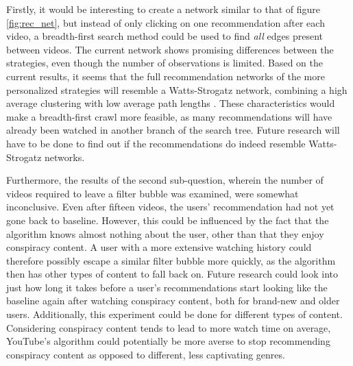 \documentclass[../main.tex]{subfiles}
\begin{document}
Firstly, it would be interesting to create a network similar to that of figure \ref{fig:rec_net}, but instead of only 
clicking on one recommendation after each video, a breadth-first search method could be used to find \textit{all} edges 
present between videos. The current network shows promising differences between the strategies, even though the number 
of observations is limited. Based on the current results, it seems that the full recommendation networks of the more
personalized strategies will resemble a Watts-Strogatz network, combining a high average clustering with low average
path lengths \citep{watts1998collective}. These characteristics would make a breadth-first crawl more feasible, as many
recommendations will have already been watched in another branch of the search tree. Future research will have to be
done to find out if the recommendations do indeed resemble Watts-Strogatz networks. 

Furthermore, the results of the second sub-question, wherein the number of videos required to leave a filter bubble was
examined, were somewhat inconclusive. Even after fifteen videos, the users' recommendation had not yet gone back to
baseline. However, this could be influenced by the fact that the algorithm knows almost nothing about the user, other
than that they enjoy conspiracy content. A user with a more extensive watching history could therefore possibly escape a
similar filter bubble more quickly, as the algorithm then has other types of content to fall back on. Future research
could look into just how long it takes before a user's recommendations start looking like the baseline again after
watching conspiracy content, both for brand-new and older users. Additionally, this experiment could be done for
different types of content. Considering conspiracy content tends to lead to more watch time on average, YouTube's
algorithm could potentially be more averse to stop recommending conspiracy content as opposed to different, less
captivating genres. 
\end{document}
